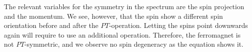 \documentclass[../main.tex]{main.tex}
\begin{document}
\begin{figure}[H]

\end{figure}
The relevant variables for the symmetry in the spectrum are the spin projection and the momentum. We see, however, that the spin show a different spin orientation before and after the $PT$-operation.
Letting the spins point downwards again will require to use an additional operation. Therefore, the ferromagnet is not $PT$-symmetric, and we observe no spin degeneracy as the
equation shows it.\\
\end{document}
